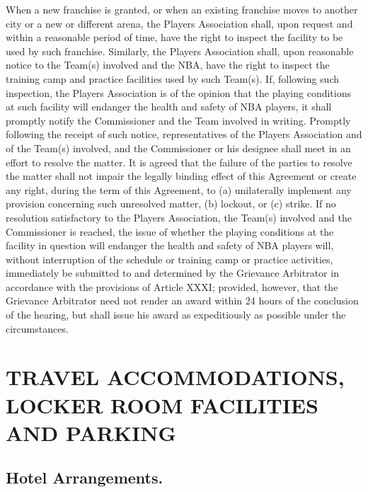 \documentclass[
]{book}
\begin{document}
When a new franchise is granted, or when an existing franchise moves to another city or a new or different arena, the Players Association shall, upon request and within a reasonable period of time, have the right to inspect the facility to be used by such franchise. Similarly, the Players Association shall, upon reasonable notice to the Team(s) involved and the NBA, have the right to inspect the training camp and practice facilities used by such Team(s). If, following such inspection, the Players Association is of the opinion that the playing conditions at such facility will endanger the health and safety of NBA players, it shall promptly notify the Commissioner and the Team involved in writing. Promptly following the receipt of such notice, representatives of the Players Association and of the Team(s) involved, and the Commissioner or his designee shall meet in an effort to resolve the matter. It is agreed that the failure of the parties to resolve the matter shall not impair the legally binding effect of this Agreement or create any right, during the term of this Agreement, to (a) unilaterally implement any provision concerning such unresolved matter, (b) lockout, or (c) strike. If no resolution satisfactory to the Players Association, the Team(s) involved and the Commissioner is reached, the issue of whether the playing conditions at the facility in question will endanger the health and safety of NBA players will, without interruption of the schedule or training camp or practice activities, immediately be submitted to and determined by the Grievance Arbitrator in accordance with the provisions of Article XXXI; provided, however, that the Grievance Arbitrator need not render an award within 24 hours of the conclusion of the hearing, but shall issue his award as expeditiously as possible under the circumstances.

\hypertarget{travel-accommodations-locker-room-facilities-and-parking}{%
\chapter{TRAVEL ACCOMMODATIONS, LOCKER ROOM FACILITIES AND PARKING}\label{travel-accommodations-locker-room-facilities-and-parking}}


\hypertarget{hotel-arrangements.}{%
\section{Hotel Arrangements.}\label{hotel-arrangements.}}
\end{document}
